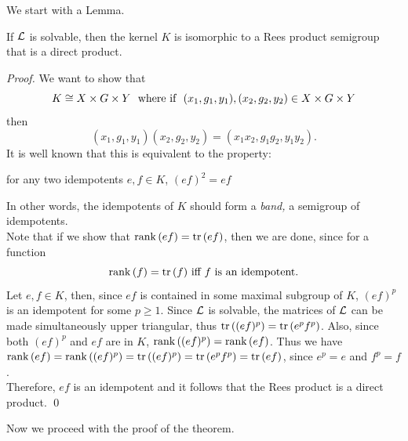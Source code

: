 We start with a Lemma.
\begin{lemma}\label{lem:dirprod} \label{lem:4.1}    
If ${\mathcal L}$ is solvable, then the kernel $K$ is isomorphic 
to a Rees product semigroup that is a direct product.
\end{lemma}

\begin{proof}
We want to show that
$$
  K \cong X \times G \times Y \hbox{ \ where if \ }
	(x_1,g_1,y_1), (x_2,g_2,y_2) \in X \times G \times Y
$$
then
$$
  (x_1,g_1,y_1) (x_2,g_2,y_2) = (x_1x_2,g_1g_2,y_1y_2).
$$
It is well known that this is equivalent to the property: \\
\begin{center}
 for any two idempotents $e,f \in K$, $(ef)^2=ef$
\end{center}
\hfill\break
In other words, the idempotents of $K$ should form a {\sl band,} a semigroup of idempotents.\\

Note that if we show that ${\rm rank}\,(ef) =  {\rm tr}\,(ef)$, then we are done, since for a function 
$$
  {\rm rank}\,(f) = {\rm tr}\,(f) \hbox{ iff } 
	f \hbox{ is an idempotent.}
$$
Let $e,f\in K$, then,
since $ef$ is contained in some maximal subgroup of $K$,
$(ef)^p$ is an idempotent for some $p\ge1$.
Since ${\mathcal L}$ is solvable, the matrices of ${\mathcal L}$ can be made simultaneously upper triangular, thus ${\rm tr}\,((ef)^p) = {\rm tr}\,(e^pf^p)$.
Also, since both $(ef)^p$ and $ef$ are in $K$, ${\rm rank}\,((ef)^p) = {\rm rank}\,(ef)$. 
Thus we have ${\rm rank}\,(ef) = {\rm rank}\,((ef)^p) = {\rm tr}\,((ef)^p) = {\rm tr}\,(e^pf^p) = {\rm tr}\,(ef)$, since $e^p=e$ and
$f^p=f$.\\
Therefore, $ef$ is an idempotent and it follows that the Rees product is a direct product.
\qed
\end{proof}

Now we proceed with the proof of the theorem.\\

